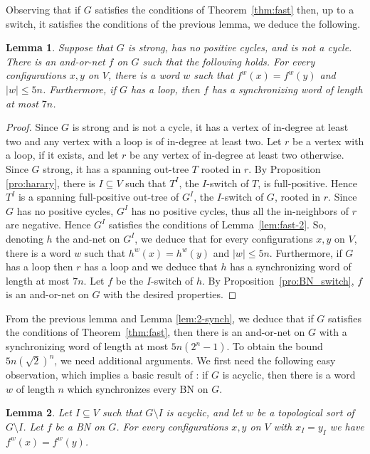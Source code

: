 \documentclass[11pt,letter]{article}
\newtheorem{lemma}{Lemma}
\begin{document}
Observing that if $G$ satisfies the conditions of Theorem~\ref{thm:fast} then, up to a switch, it satisfies the conditions of the previous lemma, we deduce the following. 

\begin{lemma}\label{lem:fast-3}
Suppose that $G$ is strong, has no positive cycles, and is not a cycle. There is an and-or-net $f$ on $G$ such that the following holds. For every configurations $x,y$ on $V$, there is a word $w$ such that $f^w(x)=f^w(y)$ and $|w|\leq 5n$. Furthermore, if $G$ has a loop, then $f$ has a synchronizing word of length at most $7n$. 
\end{lemma}

\begin{proof}
Since $G$ is strong and is not a cycle, it has a vertex of in-degree at least two and any vertex with a loop is of in-degree at least two. Let $r$ be a vertex with a loop, if it exists, and let $r$ be any vertex of in-degree at least two otherwise.  Since $G$ strong, it has a spanning out-tree $T$ rooted in $r$. By Proposition \ref{pro:harary}, there is $I\subseteq V$ such that $T^I$, the $I$-switch of $T$, is full-positive. Hence $T^I$ is a spanning full-positive out-tree of $G^I$, the $I$-switch of $G$, rooted in $r$. Since $G$ has no positive cycles, $G^I$ has no positive cycles, thus all the in-neighbors of $r$ are negative. Hence $G^I$ satisfies the conditions of Lemma~\ref{lem:fast-2}. So, denoting $h$ the and-net on $G^I$, we deduce that for every configurations $x,y$ on $V$, there is a word $w$ such that $h^w(x)=h^w(y)$ and $|w|\leq 5n$. Furthermore, if $G$ has a loop then $r$ has a loop and we deduce that $h$ has a synchronizing word of length at most $7n$. Let $f$ be the $I$-switch of $h$. By Proposition~\ref{pro:BN_switch}, $f$ is an and-or-net on $G$ with the desired properties. 
\end{proof}

From the previous lemma and Lemma \ref{lem:2-synch}, we deduce that if $G$ satisfies the conditions of Theorem~\ref{thm:fast}, then there is an and-or-net on $G$ with a synchronizing word of length at most $5n(2^n-1)$. To obtain the bound $5n(\sqrt{2})^n$, we need additional arguments. We first need the following easy observation, which implies a basic result of \cite{AGRS20}: if $G$ is acyclic, then there is a word $w$ of length $n$ which synchronizes every BN on $G$. 

\begin{lemma}\label{lem:acyclic_image}
Let $I\subseteq V$ such that $G\setminus I$ is acyclic, and let $w$ be a topological sort of $G\setminus I$. Let $f$ be a BN on $G$. For every configurations $x,y$ on $V$ with $x_I=y_I$ we have $f^w(x)=f^w(y)$. 
\end{lemma}
\end{document}
